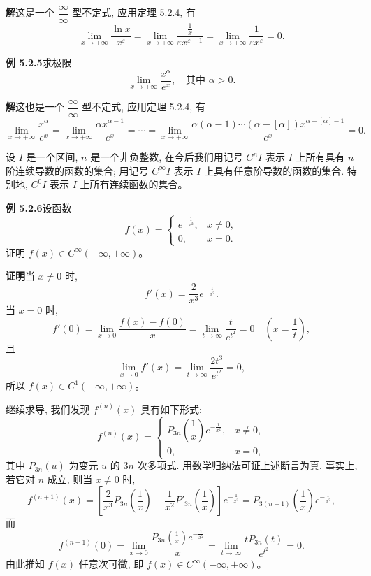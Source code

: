 \documentclass[UTF8,12pt,a4paper,fontset=fandol]{ctexart}
\begin{document}
\noindent\textbf{解}\quad 这是一个 $\dfrac\infty\infty$ 型不定式, 应用定理 5.2.4, 有
\[
  \lim_{x\to+\infty}\frac{\ln x}{x^\varepsilon}
  =
  \lim_{x\to+\infty}\frac{\frac1x}{\varepsilon x^{\varepsilon-1}}
  =
  \lim_{x\to+\infty}\frac1{\varepsilon x^\varepsilon}=0.
\]

\noindent\textbf{例 5.2.5}\quad 求极限
\[
  \lim_{x\to+\infty}\frac{x^\alpha}{e^x},\quad \text{其中 }\alpha>0.
\]

\noindent\textbf{解}\quad 这也是一个 $\dfrac\infty\infty$ 型不定式, 应用定理 5.2.4, 有
\[
  \lim_{x\to+\infty}\frac{x^\alpha}{e^x}
  =
  \lim_{x\to+\infty}\frac{\alpha x^{\alpha-1}}{e^x}
  =
  \cdots
  =
  \lim_{x\to+\infty}
  \frac{\alpha(\alpha-1)\cdots(\alpha-[\alpha])x^{\alpha-[\alpha]-1}}{e^x}
  =
  0.
\]

设 $I$ 是一个区间, $n$ 是一个非负整数, 在今后我们用记号 $C^nI$ 表示 $I$ 上所有具有 $n$ 阶连续导数的函数的集合; 用记号 $C^\infty I$ 表示 $I$ 上具有任意阶导数的函数的集合. 特别地, $C^0I$ 表示 $I$ 上所有连续函数的集合。

\noindent\textbf{例 5.2.6}\quad 设函数
\[
  f(x)=
  \begin{cases}
    e^{-\frac1{x^2}}, & x\ne0,\\
    0, & x=0.
  \end{cases}
\]
证明 $f(x)\in C^\infty(-\infty,+\infty)$。

\noindent\textbf{证明}\quad 当 $x\ne0$ 时,
\[
  f'(x)=\frac2{x^3}e^{-\frac1{x^2}}.
\]
当 $x=0$ 时,
\[
  f'(0)=\lim_{x\to0}\frac{f(x)-f(0)}x
  =
  \lim_{t\to\infty}\frac{t}{e^{t^2}}
  =
  0\quad \left(x=\frac1t\right),
\]
且
\[
  \lim_{x\to0}f'(x)
  =
  \lim_{t\to\infty}\frac{2t^3}{e^{t^2}}
  =
  0,
\]
所以 $f(x)\in C^1(-\infty,+\infty)$。

继续求导, 我们发现 $f^{(n)}(x)$ 具有如下形式:
\[
  f^{(n)}(x)=
  \begin{cases}
    P_{3n}\left(\dfrac1x\right)e^{-\frac1{x^2}}, & x\ne0,\\
    0, & x=0,
  \end{cases}
\]
其中 $P_{3n}(u)$ 为变元 $u$ 的 $3n$ 次多项式. 用数学归纳法可证上述断言为真. 事实上, 若它对 $n$ 成立, 则当 $x\ne0$ 时,
\[
  f^{(n+1)}(x)
  =
  \left[
    \frac2{x^3}P_{3n}\left(\frac1x\right)
    -
    \frac1{x^2}P'_{3n}\left(\frac1x\right)
  \right]e^{-\frac1{x^2}}
  =
  P_{3(n+1)}\left(\frac1x\right)e^{-\frac1{x^2}},
\]
而
\[
  f^{(n+1)}(0)
  =
  \lim_{x\to0}
  \frac{P_{3n}\left(\frac1x\right)e^{-\frac1{x^2}}}{x}
  =
  \lim_{t\to\infty}\frac{tP_{3n}(t)}{e^{t^2}}
  =
  0.
\]
由此推知 $f(x)$ 任意次可微, 即 $f(x)\in C^\infty(-\infty,+\infty)$。
\end{document}
